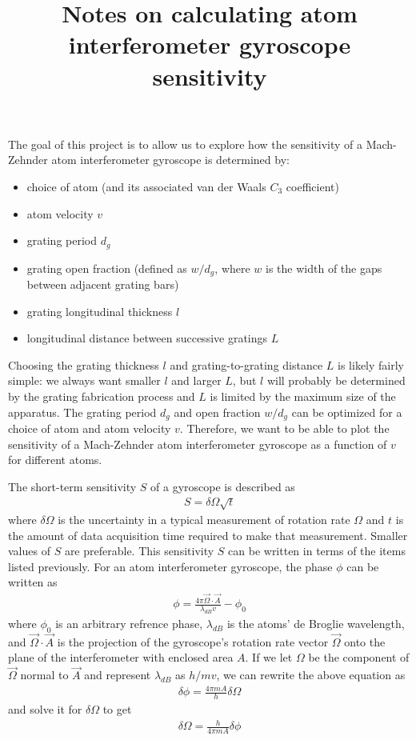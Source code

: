 \documentclass[twocolumn,pra,showpacs,superscriptaddress,longbibliography]{revtex4-1}   %
\begin{document}
\title{Notes on calculating atom interferometer gyroscope sensitivity}
\maketitle


The goal of this project is to allow us to explore how the sensitivity of a Mach-Zehnder atom interferometer gyroscope is determined by:
\begin{itemize}
	\item choice of atom (and its associated van der Waals $C_3$ coefficient)
	\item atom velocity $v$
	\item grating period $d_g$
	\item grating open fraction (defined as $w/d_g$, where $w$ is the width of the gaps between adjacent grating bars)
	\item grating longitudinal thickness $l$
	\item longitudinal distance between successive gratings $L$
\end{itemize}
Choosing the grating thickness $l$ and grating-to-grating distance $L$ is likely fairly simple: we always want smaller $l$ and larger $L$, but $l$ will probably be determined by the grating fabrication process and $L$ is limited by the maximum size of the apparatus. The grating period $d_g$ and open fraction $w/d_g$ can be optimized for a choice of atom and atom velocity $v$. Therefore, we want to be able to plot the sensitivity of a Mach-Zehnder atom interferometer gyroscope as a function of $v$ for different atoms.

The short-term sensitivity $S$ of a gyroscope is described as 
\begin{align}
	S = \delta\Omega \sqrt{t}
	\label{sensitivityGeneral}
\end{align}
where $\delta\Omega$ is the uncertainty in a typical measurement of rotation rate $\Omega$ and $t$ is the amount of data acquisition time required to make that measurement. Smaller values of $S$ are preferable.
This sensitivity $S$ can be written in terms of the items listed previously.
For an atom interferometer gyroscope, the phase $\phi$ can be written as
\begin{align}
	\phi = \frac{4\pi\vec{\Omega}\cdot\vec{A}}{\lambda_{dB} v} - \phi_0
\end{align}
where $\phi_0$ is an arbitrary refrence phase, $\lambda_{dB}$ is the atoms' de Broglie wavelength, and $\vec{\Omega}\cdot\vec{A}$ is the projection of the gyroscope's rotation rate vector $\vec{\Omega}$ onto the plane of the interferometer with enclosed area $A$. If we let $\Omega$ be the component of $\vec{\Omega}$ normal to $\vec{A}$ and represent $\lambda_{dB}$ as $h/mv$, we can rewrite the above equation as
\begin{align}
	\delta\phi = \frac{4\pi m A}{h}\delta\Omega
\end{align}
and solve it for $\delta\Omega$ to get
\begin{align}
	\delta\Omega = \frac{h}{4\pi m A}\delta\phi
	\label{deltaOmega}
\end{align}
\end{document}
